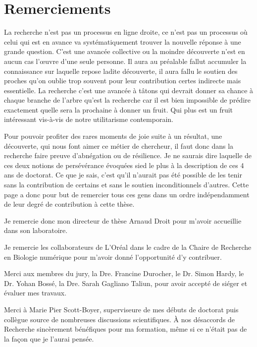 \chapter*{Remerciements}         %

La recherche n'est pas un processus en ligne droite, ce n'est pas un processus où celui qui est en avance va systématiquement trouver la nouvelle réponse à une grande question. C'est une avancée collective ou la moindre découverte n'est en aucun cas l'œuvre d'une seule personne. Il aura au préalable fallut accumuler la connaissance sur laquelle repose ladite découverte, il aura fallu le soutien des proches qu'on oublie trop souvent pour leur contribution certes indirecte mais essentielle. La recherche c'est une avancée à tâtons qui devrait donner sa chance à chaque branche de l'arbre qu'est la recherche car il est bien impossible de prédire exactement quelle sera la prochaine à donner un fruit. Qui plus est un fruit intéressant vis-à-vis de notre utilitarisme contemporain.

Pour pouvoir profiter des rares moments de joie suite à un résultat, une découverte, qui nous font aimer ce métier de chercheur, il faut donc dans la recherche faire preuve d'abnégation ou de résilience. Je ne saurais dire laquelle de ces deux notions de persévérance évoquées sied le plus à la description de ces 4 ans de doctorat. Ce que je sais, c'est qu'il n'aurait pas été possible de les tenir sans la contribution de certains et sans le soutien inconditionnels d'autres. Cette page a donc pour but de remercier tous ces gens dans un ordre indépendamment de leur degré de contribution à cette thèse.

Je remercie donc mon directeur de thèse Arnaud Droit pour m'avoir accueillie dans son laboratoire.

Je remercie les collaborateurs de L'Oréal dans le cadre de la Chaire de Recherche en Biologie numérique pour m'avoir donné l'opportunité d'y contribuer.

Merci aux membres du jury, la Dre. Francine Durocher, le Dr. Simon Hardy, le Dr. Yohan Bossé, la Dre. Sarah Gagliano Taliun, pour avoir accepté de siéger et évaluer mes travaux.

Merci à Marie Pier Scott-Boyer, superviseure de mes débuts de doctorat puis collègue source de nombreuses discussions scientifiques. À nos désaccords de Recherche sincèrement bénéfiques pour ma formation, même si ce n'était pas de la façon que je l'aurai pensée.

